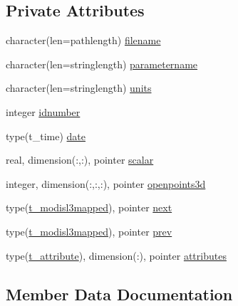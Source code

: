 \subsection*{Private Attributes}
\begin{DoxyCompactItemize}
\item 
character(len=pathlength) \mbox{\hyperlink{structmoduleconvertmodisl3mapped_1_1t__modisl3mapped_a6343d700c602e8b95b95cdca905d6155}{filename}}
\item 
character(len=stringlength) \mbox{\hyperlink{structmoduleconvertmodisl3mapped_1_1t__modisl3mapped_a1d422234e022fc3f0c9b35d311037642}{parametername}}
\item 
character(len=stringlength) \mbox{\hyperlink{structmoduleconvertmodisl3mapped_1_1t__modisl3mapped_a10adc870e9048a0c7f24db8aa1224ed9}{units}}
\item 
integer \mbox{\hyperlink{structmoduleconvertmodisl3mapped_1_1t__modisl3mapped_af147693ab56dc7515a4fff0454b4f970}{idnumber}}
\item 
type(t\+\_\+time) \mbox{\hyperlink{structmoduleconvertmodisl3mapped_1_1t__modisl3mapped_a64ad8e9777793fc34b3e136a2812a5d1}{date}}
\item 
real, dimension(\+:,\+:), pointer \mbox{\hyperlink{structmoduleconvertmodisl3mapped_1_1t__modisl3mapped_ab8c04b75dc3f63c6520539f58024f341}{scalar}}
\item 
integer, dimension(\+:,\+:,\+:), pointer \mbox{\hyperlink{structmoduleconvertmodisl3mapped_1_1t__modisl3mapped_a204832717be6e5e0a8ce6d2db66c0ddc}{openpoints3d}}
\item 
type(\mbox{\hyperlink{structmoduleconvertmodisl3mapped_1_1t__modisl3mapped}{t\+\_\+modisl3mapped}}), pointer \mbox{\hyperlink{structmoduleconvertmodisl3mapped_1_1t__modisl3mapped_ab3c791cdf9cd9db80567699ef5f4d873}{next}}
\item 
type(\mbox{\hyperlink{structmoduleconvertmodisl3mapped_1_1t__modisl3mapped}{t\+\_\+modisl3mapped}}), pointer \mbox{\hyperlink{structmoduleconvertmodisl3mapped_1_1t__modisl3mapped_a8af64980a120ed37273ed453249b99a6}{prev}}
\item 
type(\mbox{\hyperlink{structmoduleconvertmodisl3mapped_1_1t__attribute}{t\+\_\+attribute}}), dimension(\+:), pointer \mbox{\hyperlink{structmoduleconvertmodisl3mapped_1_1t__modisl3mapped_a0f8007149f5c59630dd7c898dc0a0a84}{attributes}}
\end{DoxyCompactItemize}


\subsection{Member Data Documentation}
\mbox{\label{structmoduleconvertmodisl3mapped_1_1t__modisl3mapped_a0f8007149f5c59630dd7c898dc0a0a84}} 
